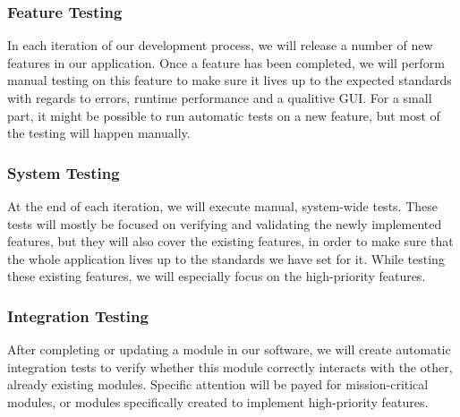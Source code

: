 \documentclass {article}
\begin{document}
\subsubsection{Feature Testing}
In each iteration of our development process, we will release a number of new features in our application. Once a feature has been completed, we will perform manual testing on this feature to make sure it lives up to the expected standards with regards to errors, runtime performance and a qualitive GUI.
For a small part, it might be possible to run automatic tests on a new feature, but most of the testing will happen manually.

\subsubsection{System Testing}
At the end of each iteration, we will execute manual, system-wide tests. These tests will mostly be focused on verifying and validating the newly implemented features, but they will also cover the existing features, in order to make sure that the whole application lives up to the standards we have set for it.
While testing these existing features, we will especially focus on the high-priority features.

\subsubsection{Integration Testing}
After completing or updating a module in our software, we will create automatic integration tests to verify whether this module correctly interacts with the other, already existing modules. Specific attention will be payed for mission-critical modules, or modules specifically created to implement high-priority features.
\end{document}
